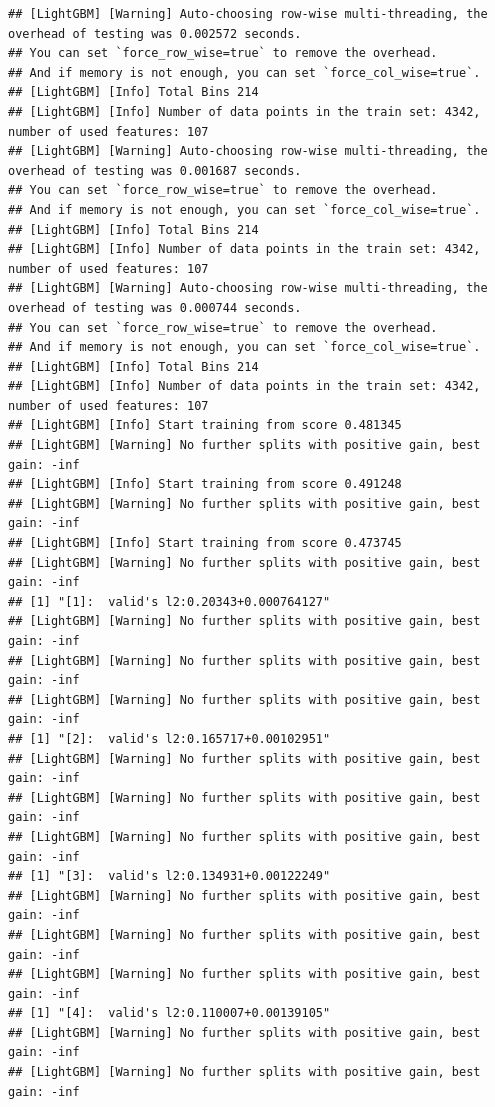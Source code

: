 \documentclass[
]{book}
\begin{document}
\begin{verbatim}
## [LightGBM] [Warning] Auto-choosing row-wise multi-threading, the overhead of testing was 0.002572 seconds.
## You can set `force_row_wise=true` to remove the overhead.
## And if memory is not enough, you can set `force_col_wise=true`.
## [LightGBM] [Info] Total Bins 214
## [LightGBM] [Info] Number of data points in the train set: 4342, number of used features: 107
## [LightGBM] [Warning] Auto-choosing row-wise multi-threading, the overhead of testing was 0.001687 seconds.
## You can set `force_row_wise=true` to remove the overhead.
## And if memory is not enough, you can set `force_col_wise=true`.
## [LightGBM] [Info] Total Bins 214
## [LightGBM] [Info] Number of data points in the train set: 4342, number of used features: 107
## [LightGBM] [Warning] Auto-choosing row-wise multi-threading, the overhead of testing was 0.000744 seconds.
## You can set `force_row_wise=true` to remove the overhead.
## And if memory is not enough, you can set `force_col_wise=true`.
## [LightGBM] [Info] Total Bins 214
## [LightGBM] [Info] Number of data points in the train set: 4342, number of used features: 107
## [LightGBM] [Info] Start training from score 0.481345
## [LightGBM] [Warning] No further splits with positive gain, best gain: -inf
## [LightGBM] [Info] Start training from score 0.491248
## [LightGBM] [Warning] No further splits with positive gain, best gain: -inf
## [LightGBM] [Info] Start training from score 0.473745
## [LightGBM] [Warning] No further splits with positive gain, best gain: -inf
## [1] "[1]:  valid's l2:0.20343+0.000764127"
## [LightGBM] [Warning] No further splits with positive gain, best gain: -inf
## [LightGBM] [Warning] No further splits with positive gain, best gain: -inf
## [LightGBM] [Warning] No further splits with positive gain, best gain: -inf
## [1] "[2]:  valid's l2:0.165717+0.00102951"
## [LightGBM] [Warning] No further splits with positive gain, best gain: -inf
## [LightGBM] [Warning] No further splits with positive gain, best gain: -inf
## [LightGBM] [Warning] No further splits with positive gain, best gain: -inf
## [1] "[3]:  valid's l2:0.134931+0.00122249"
## [LightGBM] [Warning] No further splits with positive gain, best gain: -inf
## [LightGBM] [Warning] No further splits with positive gain, best gain: -inf
## [LightGBM] [Warning] No further splits with positive gain, best gain: -inf
## [1] "[4]:  valid's l2:0.110007+0.00139105"
## [LightGBM] [Warning] No further splits with positive gain, best gain: -inf
## [LightGBM] [Warning] No further splits with positive gain, best gain: -inf

\end{verbatim}
\end{document}
